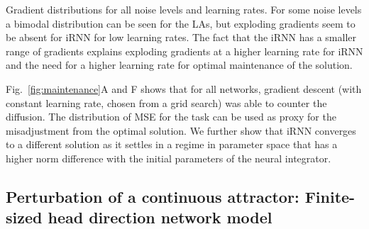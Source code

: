 \documentclass{article} %
\newcounter{ct}
\theoremstyle{definition}
\theoremstyle{remark}
\begin{document}


Gradient distributions for all noise levels and learning rates. For some noise levels a bimodal distribution can be seen for the LAs, but exploding gradients seem to be absent for iRNN for low learning rates.
The fact that the iRNN has a smaller range of gradients explains exploding gradients at a higher learning rate for iRNN and the need for a higher learning rate for optimal maintenance of the solution.

Fig.~\ref{fig:maintenance}A and F shows that for all networks, gradient descent (with constant learning rate, chosen from a grid search) was able to counter the diffusion.
The distribution of MSE for the task can be used as proxy for the misadjustment from the optimal solution. We further show that iRNN converges to a different solution as it settles in a regime in parameter space that has a higher norm difference with the initial parameters of the neural integrator.





\subsection{Perturbation of a continuous attractor: Finite-sized head direction network model}\label{sec:hd}

\end{document}
